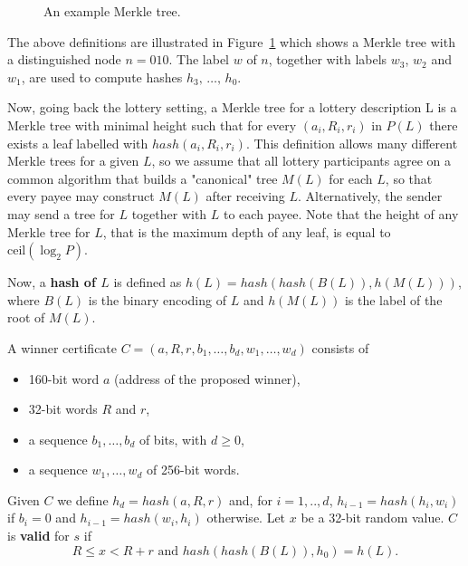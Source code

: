 \documentclass[a4paper]{article}
\begin{document}
    \begin{figure}
        
        \caption{An example Merkle tree.}
        \label{fig:merkle}
    \end{figure}

    The above definitions are illustrated in Figure~\ref{fig:merkle} which shows a Merkle tree with a distinguished
    node $n = 010$. The label $w$ of $n$, together with labels $w_3$, $w_2$ and $w_1$, are used to compute hashes
    $h_3, \,\ldots, \,h_0$.


    Now, going back the lottery setting, a Merkle tree for a lottery description L is a Merkle tree with minimal height
    such that for every $(a_i, R_i, r_i)$ in $P(L)$ there exists a leaf labelled with $hash(a_i, R_i, r_i)$.
    This definition allows many different Merkle trees for a given $L$, so we assume that all lottery participants
    agree on a common algorithm that builds a "canonical" tree $M(L)$ for each $L$, so that every payee may construct
    $M(L)$ after receiving $L$. Alternatively, the sender may send a tree for $L$ together with $L$ to each payee.
    Note that the height of any Merkle tree for $L$, that is the maximum depth of any leaf, is equal to
    $\text{ceil}(\log_2 P)$.

    Now, a \textbf{hash of $L$} is defined as $h(L) = hash(hash(B(L)), h(M(L)))$, where $B(L)$ is the binary encoding of $L$
    and $h(M(L))$ is the label of the root of $M(L)$.

    A winner certificate $C = (a, R, r, b_1, \ldots, b_d, w_1, \ldots, w_d)$ consists of
    \begin{itemize}
        \item 160-bit word $a$ (address of the proposed winner),
        \item 32-bit words $R$ and $r$,
        \item a sequence $b_1, \ldots, b_d$ of bits, with $d \geq 0$,
        \item a sequence $w_1, \ldots, w_d$ of 256-bit words.
    \end{itemize}

    Given $C$ we define $h_d = hash(a, R, r)$ and, for $i = 1, .., d$, $h_{i-1} = hash(h_i, w_i)$ if $b_i = 0$ and
    $h_{i-1} = hash(w_i, h_i)$ otherwise.
    Let $x$ be a 32-bit random value. $C$ is \textbf{valid} for $s$ if
    \begin{displaymath}
        R \leq x < R + r  \text{ and } hash(hash(B(L)), h_0) = h(L).
    \end{displaymath}
\end{document}
